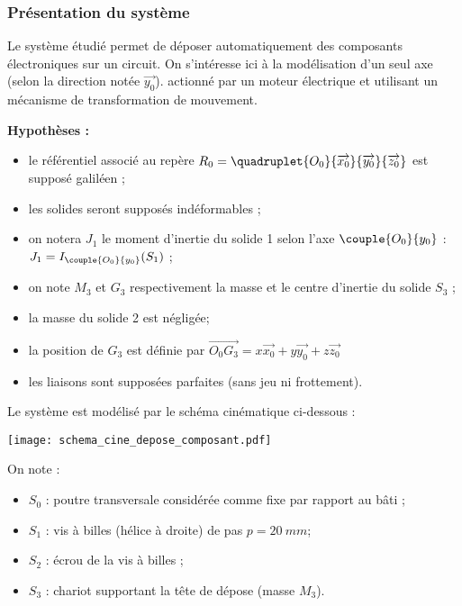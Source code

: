 \ifprof
\else
\begin{multicols}{2}
\fi


\subsubsection*{Présentation du système}
\ifprof
\else
Le système étudié permet de déposer automatiquement des composants électroniques sur un circuit.
On s'intéresse ici à la modélisation d'un seul axe (selon la direction notée $\overrightarrow{y_0}$). actionné par un moteur électrique et utilisant un mécanisme de transformation de mouvement.
%
%


\noindent \textbf{Hypothèses :}
\begin{itemize}
\item le référentiel associé au repère $R_0=\quadruplet{O_0}{\overrightarrow{x_0}}{\overrightarrow{y_0}}{\overrightarrow{z_0}}$ est supposé galiléen ;
\item les solides seront supposés indéformables ; 
\item on notera $J_1$ le moment d'inertie du solide 1 selon l'axe $\couple{O_0}{y_0}$ : $J_1=I_{\couple{O_0}{y_0}}(S_1)$ ;
\item on note $M_3$ et $G_3$ respectivement la masse et le centre d'inertie du solide $S_3$ ;
\item la masse du solide 2 est négligée;
\item la position de $G_3$ est définie par $\overrightarrow{O_0G_3}=x\overrightarrow{x_0}+y \overrightarrow{y_0}+z \overrightarrow{z_0}$
\item les liaisons sont supposées parfaites (sans jeu ni frottement).
\end{itemize}

Le système est modélisé par le schéma cinématique ci-dessous :
\begin{center}
\texttt{[image: schema\_cine\_depose\_composant.pdf]}
\end{center}

On note : 
\begin{itemize}
\item $S_0$ : poutre transversale considérée comme fixe par rapport au bâti ;
\item $S_1$ : vis à billes (hélice à droite) de pas $p=\SI{20}{mm}$;
\item $S_2$ : écrou de la vis à billes ;
\item $S_3$ : chariot supportant la tête de dépose (masse $M_3$).
\end{itemize}



\end{multicols}
